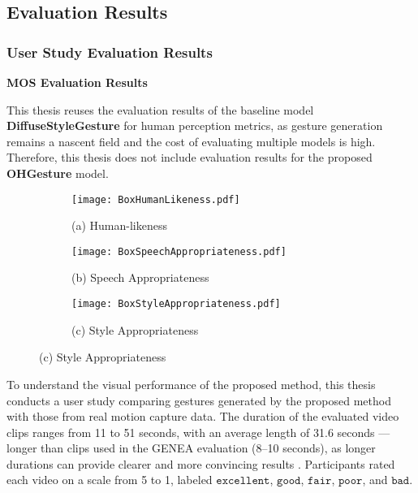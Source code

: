 \subsection{Evaluation Results}
\label{sec:result}

\subsubsection{User Study Evaluation Results}

\textbf{MOS Evaluation Results}

This thesis reuses the evaluation results of the baseline model \textbf{DiffuseStyleGesture} \cite{yang2023diffusestylegesture} for human perception metrics, as gesture generation remains a nascent field and the cost of evaluating multiple models is high. Therefore, this thesis does not include evaluation results for the proposed \textbf{OHGesture} model.

\begin{figure}[htbp]
	\centering
	\begin{subfigure}[b]{0.3\textwidth}
		\texttt{[image: BoxHumanLikeness.pdf]}
		\caption*{(a) Human-likeness}
	\end{subfigure}
	\hfill
	\begin{subfigure}[b]{0.3\textwidth}
		\texttt{[image: BoxSpeechAppropriateness.pdf]}
		\caption*{\small (b) Speech Appropriateness}
	\end{subfigure}
	\hfill
	\begin{subfigure}[b]{0.3\textwidth}
		\texttt{[image: BoxStyleAppropriateness.pdf]}
		\caption*{(c) Style Appropriateness}
	\end{subfigure}
	
	\label{fig:compare }
\end{figure}

To understand the visual performance of the proposed method, this thesis conducts a user study comparing gestures generated by the proposed method with those from real motion capture data. The duration of the evaluated video clips ranges from 11 to 51 seconds, with an average length of 31.6 seconds — longer than clips used in the GENEA evaluation \cite{yoon2022genea} (8–10 seconds), as longer durations can provide clearer and more convincing results \cite{yang2022reprgesture}. Participants rated each video on a scale from 5 to 1, labeled $\texttt{excellent}$, $\texttt{good}$, $\texttt{fair}$, $\texttt{poor}$, and $\texttt{bad}$. 

